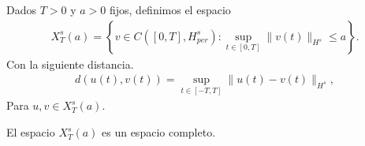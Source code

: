     \begin{definition}
        Dados $T>0$ y $a>0$ fijos, definimos el espacio
            \begin{align*}
                X^{s}_{T}(a) = \left\{v \in C([0,T], H^{s}_{per}) : \sup_{t \in [0,T]} \|v(t)\|_{H^{s}} \leq a \right\}.
            \end{align*}
        Con la siguiente distancia.
        \begin{align*}
            d(u(t), v(t)) = \sup_{t \in [-T,T]} \|u(t) - v(t)\|_{H^{s}},
        \end{align*}
        Para $u,v \in X^{s}_{T}(a)$.\\
    \end{definition}
    \begin{theorem}
        El espacio $X_T^s(a)$ es un espacio completo.
    \end{theorem}

